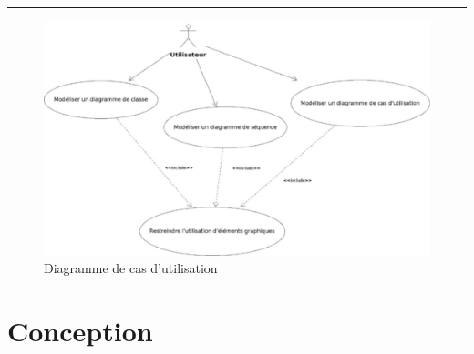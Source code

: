 \documentclass[12pt,a4paper,openany]{report}
\newcommand{\separateur}{\begin{center}\rule{12.6cm}{.5pt}\end{center}}
\begin{document}
	\separateur
	\begin{figure}[H]
		\centering
		\includegraphics[width=19cm]{casUtilisation.jpg}
		\caption{Diagramme de cas d'utilisation}
	\end{figure}
	\chapter{Conception}
\end{document}
